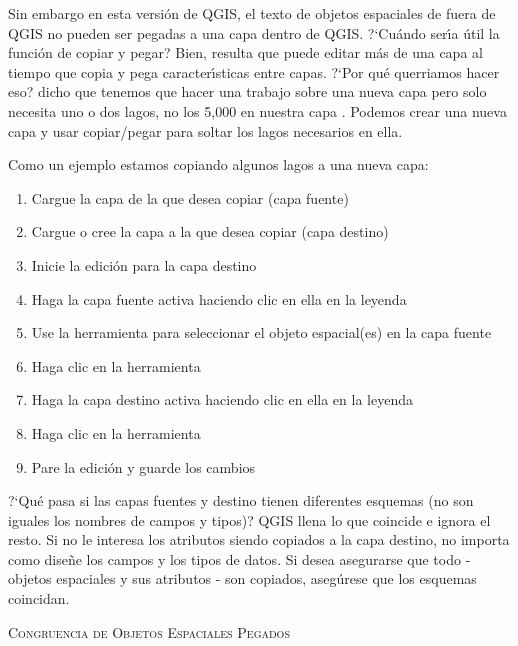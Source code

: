 Sin embargo en esta versi\'on de QGIS, el texto de objetos espaciales de fuera de QGIS no pueden 
ser pegadas a una capa dentro de QGIS. ?`Cu\'ando ser\'{\i}a \'util la funci\'on de copiar y pegar? 
Bien, resulta que puede editar más de una capa 
al tiempo que copia y pega caracter\'{\i}sticas entre capas. ?`Por qu\'e querriamos hacer
eso?  dicho que tenemos que hacer una trabajo sobre una nueva capa pero solo necesita uno o
dos lagos, no los 5,000 en nuestra capa . Podemos crear una nueva capa
y usar copiar/pegar para soltar los lagos necesarios en ella. 

Como un ejemplo estamos copiando algunos lagos a una nueva capa:

\begin{enumerate}
\item Cargue la capa de la que desea copiar (capa fuente)
\item Cargue o cree la capa a la que desea copiar (capa destino) 
\item Inicie la edici\'on para la capa destino
\item Haga la capa fuente activa haciendo clic en ella en la leyenda 
\item Use la herramienta  para seleccionar el objeto espacial(es) en la capa fuente
\item Haga clic en la herramienta 
\item Haga la capa destino activa haciendo clic en ella en la leyenda 
\item Haga clic en la herramienta 
\item Pare la edici\'on y guarde los cambios
\end{enumerate}

?`Qu\'e pasa si las capas fuentes y destino tienen
diferentes esquemas (no son iguales los nombres de campos y tipos)? QGIS llena
lo que coincide e ignora el resto. Si no le interesa los atributos
siendo copiados a la capa destino, no importa como dise\~ne los
campos y los tipos de datos. Si desea asegurarse que todo - objetos espaciales y sus
atributos - son copiados, aseg\'urese que los esquemas coincidan.

\begin{Tip}[ht]\caption{\textsc{Congruencia de Objetos Espaciales Pegados}}
\end{Tip}

